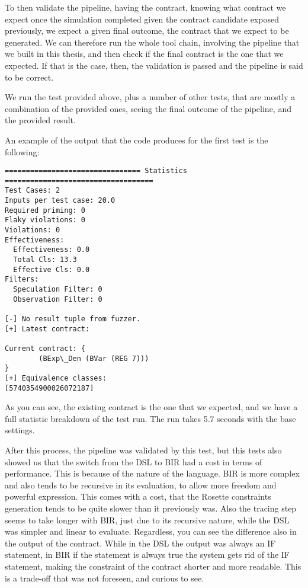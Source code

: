 To then validate the pipeline, having the contract, knowing what contract we expect
once the simulation completed given the contract candidate exposed previously,
we expect a given final outcome, the contract that we expect to be generated. We
can therefore run the whole tool chain, involving the pipeline that we built in this
thesis, and then check if the final contract is the one that we expected. If that
is the case, then, the validation is passed and the pipeline is said to be correct.

We run the test provided above, plus a number of other tests, that are mostly a combination
of the provided ones, seeing the final outcome of the pipeline, and the provided
result.

An example of the output that the code produces for the first test is the following:
\begin{verbatim}
================================ Statistics ===================================
Test Cases: 2
Inputs per test case: 20.0
Required priming: 0
Flaky violations: 0
Violations: 0
Effectiveness: 
  Effectiveness: 0.0
  Total Cls: 13.3
  Effective Cls: 0.0
Filters:
  Speculation Filter: 0
  Observation Filter: 0

[-] No result tuple from fuzzer.
[+] Latest contract:

Current contract: {
        (BExp\_Den (BVar (REG 7)))
}
[+] Equivalence classes:
[5740354900026072187]
\end{verbatim}
As you can see, the existing contract is the one that we expected, and we have a
full statistic breakdown of the test run. The run takes 5.7 seconds with the base
settings.

After this process, the pipeline was validated by this test, but this tests also
showed us that the switch from the DSL to BIR had a cost in terms of performance.
This is because of the nature of the language. BIR is more complex and also tends
to be recursive in its evaluation, to allow more freedom and powerful expression.
This comes with a cost, that the Rosette constraints generation tends to be
quite slower than it previously was. Also the tracing step seems to take longer with
BIR, just due to its recursive nature, while the DSL was simpler and linear to evaluate.
Regardless, you can see the difference also in the output of the contract. While
in the DSL the output was always an IF statement, in BIR if the statement is always
true the system gets rid of the IF statement, making the constraint of the
contract shorter and more readable. This is a trade-off that was not foreseen,
and curious to see.

